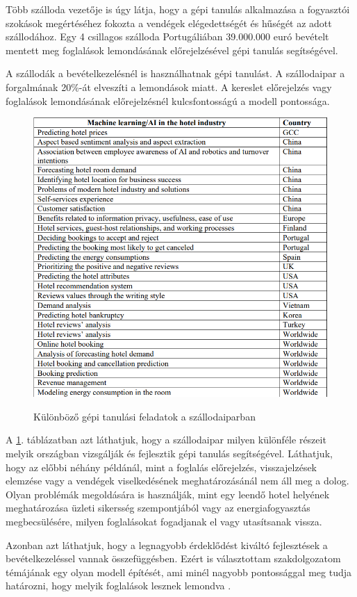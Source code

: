 Több szálloda vezetője is úgy látja, hogy a gépi tanulás alkalmazása a fogyasztói szokások megértéséhez fokozta a vendégek elégedettségét és hűségét az adott szállodához. Egy 4 csillagos szálloda Portugáliában 39.000.000 euró bevételt mentett meg foglalások lemondásának előrejelzésével gépi tanulás segítségével.

A szállodák a bevételkezelésnél is használhatnak gépi tanulást. A szállodaipar a forgalmának 20\%-át elveszíti a lemondások miatt. A kereslet előrejelzés vagy foglalások lemondásának előrejelzésnél kulcsfontosságú a modell pontossága.

\begin{figure}[hbt!]
    \centering
    \caption{Különböző gépi tanulási feladatok a szállodaiparban}
    \includegraphics[width=\textwidth]{images/2.fejezet/Gepi_tanulas_szallodaipar.PNG}
    \label{fig:gepitanulasszallodaiparban}
\end{figure}

A \ref{fig:gepitanulasszallodaiparban}. táblázatban azt láthatjuk, hogy a szállodaipar milyen különféle részeit melyik országban vizsgálják és fejlesztik gépi tanulás segítségével. Láthatjuk, hogy az előbbi néhány példánál, mint a foglalás előrejelzés, visszajelzések elemzése vagy a vendégek viselkedésének meghatározásánál nem áll meg a dolog. Olyan problémák megoldására is használják, mint egy leendő hotel helyének meghatározása üzleti sikersség szempontjából vagy az energiafogyasztás megbecsülésére, milyen foglalásokat fogadjanak el vagy utasítsanak vissza.

Azonban azt láthatjuk, hogy a legnagyobb érdeklődést kiváltó fejlesztések a bevételkezeléssel vannak összefüggésben. Ezért is választottam szakdolgozatom témájának egy olyan modell építését, ami minél nagyobb pontossággal meg tudja határozni, hogy melyik foglalások lesznek lemondva \cite{gepi_tanulas_szallodaipar}.